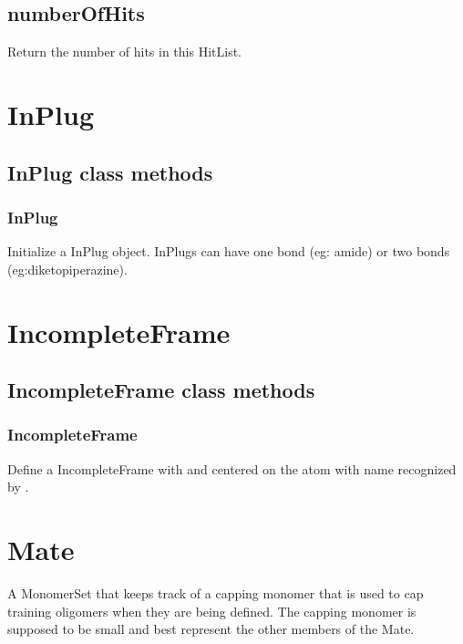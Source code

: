 \begin{itemize}
\subsection{numberOfHits}
  \par
  Return the number of hits in this HitList.

\section{InPlug}
\subsection{InPlug class methods}
\subsubsection{InPlug}

Initialize a InPlug object. InPlugs can have one bond (eg: amide) or two bonds (eg:diketopiperazine).

\section{IncompleteFrame}
\subsection{IncompleteFrame class methods}
\subsubsection{IncompleteFrame}

Define a IncompleteFrame with  and centered on the atom with name 
recognized by .


\section{Mate}
A MonomerSet that keeps track of a capping monomer that is used to cap training oligomers when they are being defined.
The capping monomer is supposed to be small and best represent the other members of the Mate.


\end{itemize}
